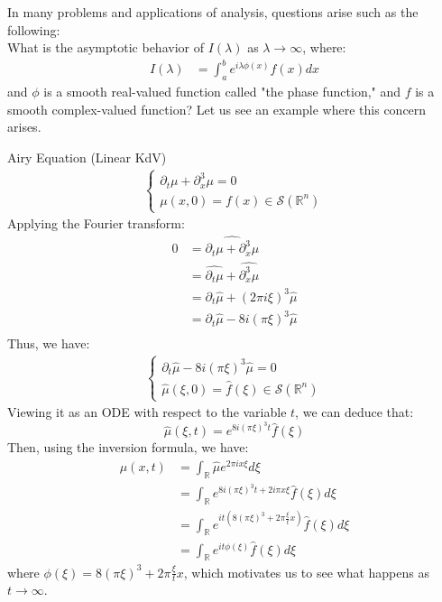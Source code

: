 In many problems and applications of analysis, questions arise such as the following:\\
What is the asymptotic behavior of $I(\lambda)$ as $\lambda\rightarrow\infty$, where:
\begin{align*}
  I(\lambda)&=\int_{a}^{b}e^{i\lambda\phi(x)}f(x)dx
\end{align*}
and $\phi$ is a smooth real-valued function called "the phase function," and $f$ is a smooth complex-valued function? 
Let us see an example where this concern arises.  
\begin{example}{Airy Equation (Linear KdV)}
  \begin{align*}
    \begin{cases}
      \partial_t\mu +\partial_x^3\mu=0\\
      \mu(x,0)=f(x)\in\mathcal{S}(\mathbb{R}^n)
    \end{cases}
  \end{align*}
  Applying the Fourier transform:
  \begin{align*}
    0&=\hat{\partial_t\mu + \partial_x^3\mu}\\
    &=\hat{\partial_t\mu} + \hat{\partial_x^3\mu}\\
    &=\partial_t\hat{\mu} + (2\pi i\xi)^3 \hat{\mu}\\
    &=\partial_t\hat{\mu} - 8i(\pi\xi)^3 \hat{\mu}\\
  \end{align*}
  Thus, we have:
  \begin{align*}
    \begin{cases}
      \partial_t\hat{\mu} - 8i(\pi\xi)^3 \hat{\mu}=0\\
      \hat{\mu}(\xi,0)=\hat{f}(\xi)\in\mathcal{S}(\mathbb{R}^n)
    \end{cases}
  \end{align*}
  Viewing it as an ODE with respect to the variable $t$, we can deduce that:
  $$\hat{\mu}(\xi,t)=e^{8i(\pi\xi)^3t}\hat{f}(\xi)$$
  Then, using the inversion formula, we have:
  \begin{align*}
    \mu(x,t) &= \int_{\mathbb{R}}\hat{\mu}e^{2\pi ix\xi}d\xi\\
    &= \int_{\mathbb{R}} e^{8i(\pi\xi)^3t+2i\pi x\xi}\hat{f}(\xi)d\xi\\
    &= \int_{\mathbb{R}} e^{it(8(\pi\xi)^3+2\pi\frac{\xi}{t}x)}\hat{f}(\xi)d\xi\\
    &= \int_{\mathbb{R}} e^{it\phi(\xi)}\hat{f}(\xi)d\xi
  \end{align*}
  where $\phi(\xi)=8(\pi\xi)^3+2\pi\frac{\xi}{t}x$, which motivates us to see what happens as $t\rightarrow \infty$. 
\end{example}
